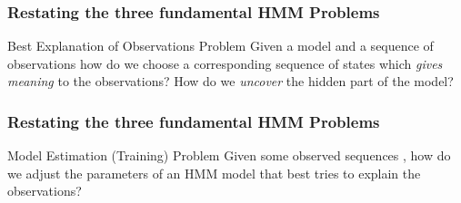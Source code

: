 \documentclass{beamer}
\begin{document}
\begin{frame}
  \frametitle{Restating the three fundamental HMM Problems}
  \begin{block}{Best Explanation of Observations Problem}
    Given a model  and a
    sequence of observations  how do we choose a corresponding sequence of
    \alert{states} 
    which \emph{gives meaning} to the observations?  How do we
    \emph{uncover} the hidden part of the model?
  \end{block}
\end{frame}




\begin{frame}
  \frametitle{Restating the three fundamental HMM Problems}
  \begin{block}{Model Estimation (Training) Problem}
    Given some observed sequences , how do we adjust the
    \alert{parameters}  of an
    HMM model that best tries to explain the observations?
  \end{block}
\end{frame}
\end{document}

